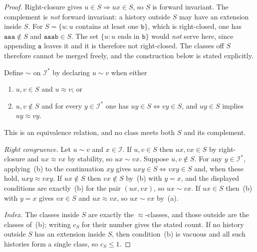 \documentclass[12pt]{article}
\theoremstyle{definition}
\begin{document}
\begin{proof}
Right-closure gives $u\in S\Rightarrow ux\in S$, so $S$ is forward invariant.
The complement is \emph{not} forward invariant: a history outside $S$ may have
an extension inside $S$.  For $S=\{u:u\text{ contains at least one }\mathtt b\}$,
which is right-closed, one has $\mathtt{aaa}\notin S$ and $\mathtt{aaab}\in S$.
The set $\{u:u\text{ ends in }\mathtt b\}$ would \emph{not} serve here, since
appending $\mathtt a$ leaves it and it is therefore not right-closed.  The
classes off $S$ therefore cannot be merged freely, and the construction below
is stated explicitly.

Define $\sim$ on $\mathcal I^*$ by declaring $u\sim v$ when either
\begin{enumerate}[label=(\alph*)]
\item $u,v\in S$ and $u\approx v$; or
\item $u,v\notin S$ and for every $y\in\mathcal I^*$ one has
$uy\in S\iff vy\in S$, and $uy\in S$ implies $uy\approx vy$.
\end{enumerate}
This is an equivalence relation, and no class meets both $S$ and its
complement.

\emph{Right congruence.}  Let $u\sim v$ and $x\in\mathcal I$.  If $u,v\in S$
then $ux,vx\in S$ by right-closure and $ux\approx vx$ by stability, so
$ux\sim vx$.  Suppose $u,v\notin S$.  For any $y\in\mathcal I^*$, applying~(b)
to the continuation $xy$ gives $uxy\in S\iff vxy\in S$ and, when these hold,
$uxy\approx vxy$.  If $ux\notin S$ then $vx\notin S$ by~(b) with $y=x$, and the
displayed conditions are exactly~(b) for the pair $(ux,vx)$, so $ux\sim vx$.
If $ux\in S$ then~(b) with $y=x$ gives $vx\in S$ and $ux\approx vx$, so
$ux\sim vx$ by~(a).

\emph{Index.}  The classes inside $S$ are exactly the $\approx$-classes, and
those outside are the classes of~(b); writing $c_S$ for their number gives the
stated count.  If no history outside $S$ has an extension inside $S$, then
condition~(b) is vacuous and all such histories form a single class, so
$c_S\le1$.
\end{proof}
\end{document}
